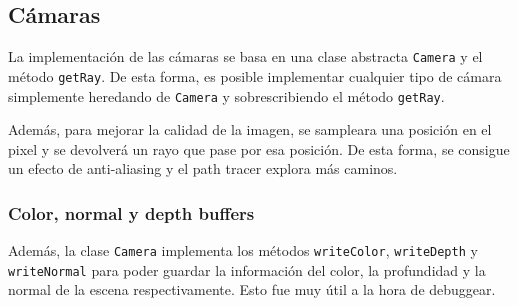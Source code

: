 \documentclass{article}
\begin{document}
\subsection{Cámaras}

La implementación de las cámaras se basa en una clase abstracta \texttt{Camera} y 
el método \texttt{getRay}. De esta forma, es posible implementar cualquier tipo
de cámara simplemente heredando de \texttt{Camera} y sobrescribiendo el método
\texttt{getRay}.

Además, para mejorar la calidad de la imagen, se sampleara una posición en el
pixel y se devolverá un rayo que pase por esa posición. De esta forma, se
consigue un efecto de anti-aliasing y el path tracer explora más caminos.

\subsubsection{Color, normal y depth buffers}

Además, la clase \texttt{Camera} implementa los métodos \texttt{writeColor},
\texttt{writeDepth} y \texttt{writeNormal} para poder guardar la información del
color, la profundidad y la normal de la escena respectivamente. Esto fue muy
útil a la hora de debuggear.
\end{document}
